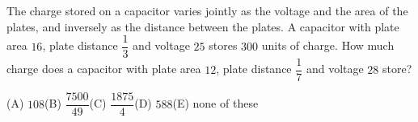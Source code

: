The charge stored on a capacitor varies jointly as the voltage and the area of the plates, and inversely as the distance between the plates. A capacitor with plate area $16$, plate distance $\dfrac{1}{3}$ and voltage $25$ stores $300$ units of charge. How much charge does a capacitor with plate area $12$, plate distance $\dfrac{1}{7}$ and voltage $28$ store?

(A) $108$\qquad (B) $\dfrac{7500}{49}$\qquad (C) $\dfrac{1875}{4}$\qquad (D) $588$\qquad (E) none of these
